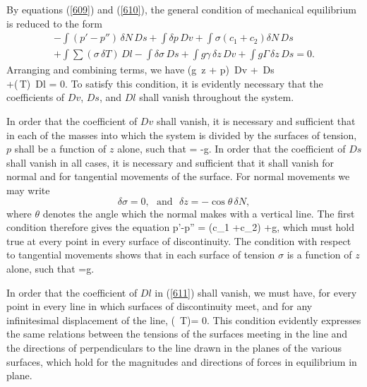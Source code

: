 \documentclass[12pt]{article}
\newcommand{\dd}{\delta}
\begin{document}
By equations (\ref{609}) and (\ref{610}), the general condition of mechanical
equilibrium is reduced to the form
\begin{equation*}\begin{aligned}- \int (p'-p'') \, \dd N \, Ds +\int \dd p \, Dv +\int \sigma (c_1 +c_2) \dd N \, Ds \\
+\int \sum (\sigma\, \dd T)\, Dl- \int \dd \sigma \, Ds+\int g\gamma\, \dd z \,Dv +\int g\Gamma\, \dd z \, Ds = 0.\end{aligned}\end{equation*}
Arranging and combining terms, we have
\eqs \int (g\gamma \, \dd z + \dd p) \,Dv +\int [(p'' -p') \dd N + \sigma (c_1 + c_2) \, \dd N+g \Gamma \, \dd z - \dd \sigma] \, Ds\\
+\int \sum (\sigma \,\dd T)\, Dl = 0. \label{611} \eqe 
To satisfy this condition, it is evidently necessary that the coefficients of $Dv$, $Ds$, and $Dl$ shall vanish throughout the system.

In order that the coefficient of $Dv$ shall vanish, it is necessary and sufficient that in each of the masses into which the system is divided by the surfaces of tension, $p$ shall be a function of $z$ alone, such that
\eqs {} =  -g\gamma.  \label{612} \eqe 
In order that the coefficient of $Ds$ shall vanish in all cases, it is necessary and sufficient that it shall vanish for normal and for tangential movements of the surface. For normal movements we may write
$$ \dd \sigma = 0, \ \ \ \text{and} \ \ \ \dd z=-\cos \theta \, \dd N,$$
where $\theta$ denotes the angle which the normal makes with a vertical line. The first condition therefore gives the equation
\eqs p'-p'' = \sigma(c_1 +c_2) +g\Gamma  \cos \theta ,   \label{613} \eqe 
which must hold true at every point in every surface of discontinuity. The condition with respect to tangential movements shows that in each surface of tension $\sigma$ is a function of $z$ alone, such that
\eqs {}=g\Gamma.         \label{614} \eqe 

In order that the coefficient of $Dl$ in (\ref{611}) shall vanish, we must have, for every point in every line in which surfaces of discontinuity meet, and for any infinitesimal displacement of the line,
\eqs \sum (\sigma \, \dd T)= 0.    \label{615} \eqe 
This condition evidently expresses the same relations between the tensions of the surfaces meeting in the line and the directions of perpendiculars to the line drawn in the planes of the various surfaces, which hold for the magnitudes and directions of forces in equilibrium in plane.
\end{document}
